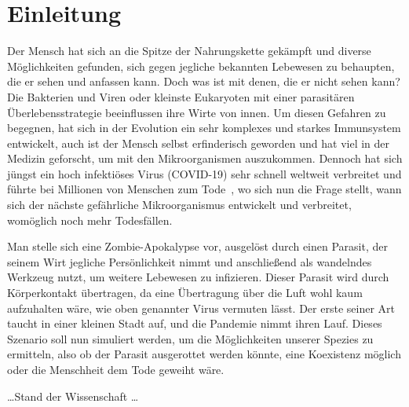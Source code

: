 \section{Einleitung} %
    \label{sec:einleitung}
    Der Mensch hat sich an die Spitze der Nahrungskette gekämpft und diverse Möglichkeiten gefunden, sich gegen jegliche bekannten Lebewesen zu behaupten, die er sehen und anfassen kann. Doch was ist mit denen, die er nicht sehen kann? Die Bakterien und Viren oder kleinste Eukaryoten mit einer parasitären Überlebensstrategie beeinflussen ihre Wirte von innen. Um diesen Gefahren zu begegnen, hat sich in der Evolution ein sehr komplexes und starkes Immunsystem entwickelt, auch ist der Mensch selbst erfinderisch geworden und hat viel in der Medizin geforscht, um mit den Mikroorganismen auszukommen. Dennoch hat sich jüngst ein hoch infektiöses Virus (COVID-19) sehr schnell weltweit verbreitet und führte bei Millionen von Menschen zum Tode\ \cite[vgl.][]{corona}, wo sich nun die Frage stellt, wann sich der nächste gefährliche Mikroorganismus entwickelt und verbreitet, womöglich noch mehr Todesfällen.

    Man stelle sich eine Zombie-Apokalypse vor, ausgelöst durch einen Parasit, der seinem Wirt jegliche Persönlichkeit nimmt und anschließend als wandelndes Werkzeug nutzt, um weitere Lebewesen zu infizieren. Dieser Parasit wird durch Körperkontakt übertragen, da eine Übertragung über die Luft wohl kaum aufzuhalten wäre, wie oben genannter Virus vermuten lässt. Der erste seiner Art taucht in einer kleinen Stadt auf, und die Pandemie nimmt ihren Lauf. Dieses Szenario soll nun simuliert werden, um die Möglichkeiten unserer Spezies zu ermitteln, also ob der Parasit ausgerottet werden könnte, eine Koexistenz möglich oder die Menschheit dem Tode geweiht wäre.

    \ldots Stand der Wissenschaft \ldots
